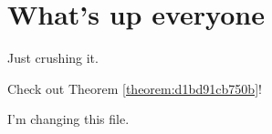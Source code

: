 \documentclass[reqno]{amsart} 
\begin{document}
\section{What's up everyone}
Just crushing it.

Check out Theorem \ref{theorem:d1bd91cb750b}!

I'm changing this file.

{} 
\end{document}
